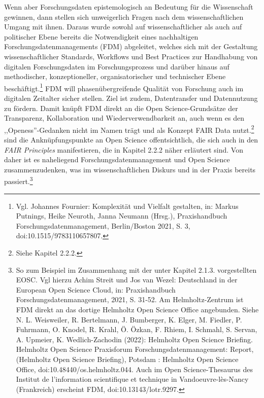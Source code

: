 Wenn aber Forschungsdaten epistemologisch an Bedeutung für die Wissenschaft gewinnen, dann stellen sich unweigerlich Fragen nach dem wissenschaftlichen Umgang mit ihnen. Daraus wurde sowohl auf wissenschaftlicher als auch auf politischer Ebene bereits die Notwendigkeit eines nachhaltigen Forschungsdatenmanagements (FDM) abgeleitet, welches sich mit der Gestaltung wissenschaftlicher Standards, Workflows und Best Practices zur Handhabung von digitalen Forschungsdaten im Forschungsprozess und darüber hinaus auf methodischer, konzeptioneller, organisatorischer und technischer Ebene beschäftigt.\footnote{Vgl. Johannes Fournier: Komplexität und Vielfalt gestalten, in: Markus Putnings, Heike Neuroth, Janna Neumann (Hrsg.), Praxishandbuch Forschungsdatenmanagement, Berlin/Boston 2021, S. 3, doi:10.1515/9783110657807.} FDM will phasenübergreifende Qualität von Forschung auch im digitalen Zeitalter sicher stellen. Ziel ist zudem, Datentransfer und Datennutzung zu fördern. Damit knüpft FDM direkt an die Open Science-Grundsätze der Transparenz, Kollaboration und Wiederverwendbarkeit an, auch wenn es den ,,Openess''-Gedanken nicht im Namen trägt und als Konzept FAIR Data nutzt.\footnote{Siehe Kapitel 2.2.2.} sind die Anknüpfungspunkte an Open Science offentsichtlich, die sich auch in den \textit{FAIR Principles} manifestieren, die in Kapitel 2.2.2 näher erläutert sind. Von daher ist es naheliegend Forschungsdatenmanagement und Open Science zusammenzudenken, was im wissenschaftlichen Diskurs und in der Praxis bereits passiert.\footnote{So zum Beispiel im Zusammenhang mit der unter Kapitel 2.1.3. vorgestellten EOSC. Vgl hierzu Achim Streit und Jos van Wezel: Deutschland in der European Open Science Cloud, in: Praxishandbuch Forschungsdatenmanagement, 2021, S. 31-52. Am Helmholtz-Zentrum ist FDM direkt an das dortige Helmholtz Open Science Office angebunden. Siehe N. L. Weisweiler, R. Bertelmann, J. Bumberger, K. Elger, M. Fiedler, P. Fuhrmann, O. Knodel, R. Krahl, Ö. Özkan, F. Rhiem, I. Schmahl, S. Servan, A. Upmeier, K. Wedlich-Zachodin (2022): Helmholtz Open Science Briefing. Helmholtz Open Science Praxisforum Forschungsdatenmanagement: Report, (Helmholtz Open Science Briefing), Potsdam : Helmholtz Open Science Office, doi:10.48440/os.helmholtz.044. Auch im Open Science-Thesaurus des Institut de l’information scientifique et technique in Vandoeuvre-lès-Nancy (Frankreich) erscheint FDM, doi:10.13143/lotr.9297.}

